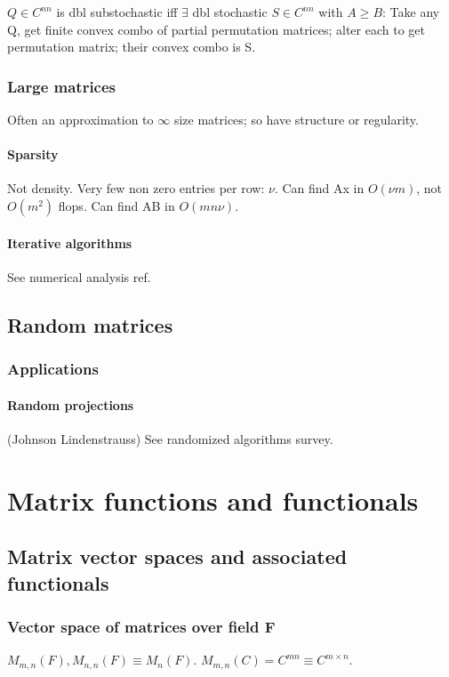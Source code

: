 \documentclass[oneside, article]{memoir}
\begin{document}
$Q \in C^{nn}$ is dbl substochastic iff $\exists$ dbl stochastic $S\in C^{nn}$ with $A \geq B$: Take any Q, get finite convex combo of partial permutation matrices; alter each to get permutation matrix; their convex combo is S.

\section{Large matrices}
Often an approximation to $\infty$ size matrices; so have structure or regularity.

\subsection{Sparsity}
Not density. Very few non zero entries per row: $\nu$. Can find Ax in $O(\nu m)$, not $O(m^{2})$ flops. Can find AB in $O(mn \nu)$.

\subsection{Iterative algorithms}
See numerical analysis ref.

\chapter{Random matrices}
\section{Applications}
\subsection{Random projections}
(Johnson Lindenstrauss) See randomized algorithms survey.

\part{Matrix functions and functionals}
\chapter{Matrix vector spaces and associated functionals}
\section{Vector space of matrices over field F}
$M_{m, n}(F), M_{n, n}(F) \equiv M_{n}(F)$. $M_{m, n}(C) = C^{mn} \equiv C^{m \times n}$.
\end{document}
